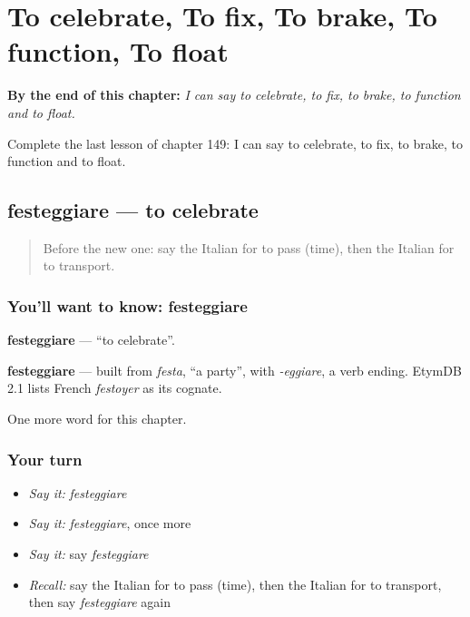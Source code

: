 
\chapter{To celebrate, To fix, To brake, To function, To float}
\label{ch:it-to-celebrate-to-fix-to-brake-to-function-to-float}

\begin{chapteropening}
\textbf{By the end of this chapter:} \emph{I can say to celebrate, to fix, to brake, to function and to float.}

Complete the last lesson of chapter 149: I can say to celebrate, to fix, to brake, to function and to float.
\end{chapteropening}

\section[festeggiare]{festeggiare — to celebrate}

\label{lesson:IT-C149-festeggiare}



\begin{quote}
Before the new one: say the Italian for to pass (time), then the Italian for to transport.
\end{quote}

\subsection*{You'll want to know: festeggiare}
\textbf{festeggiare} — \textquotedblleft{}to celebrate\textquotedblright{}.

\begin{cousinweb}
\textbf{festeggiare} — built from \emph{festa}, \textquotedblleft{}a party\textquotedblright{}, with \emph{-eggiare}, a verb ending. EtymDB 2.1 lists French \emph{festoyer} as its cognate.
\end{cousinweb}

\begin{grammarlens}[title={What you've built}]
One more word for this chapter.
\end{grammarlens}

\subsection*{Your turn}
\begin{itemize}
\raggedright
  \item \emph{Say it:} \emph{festeggiare}
  \item \emph{Say it:} \emph{festeggiare}, once more
  \item \emph{Say it:} say \emph{festeggiare}
  \item \emph{Recall:} say the Italian for to pass (time), then the Italian for to transport, then say \emph{festeggiare} again
\end{itemize}

